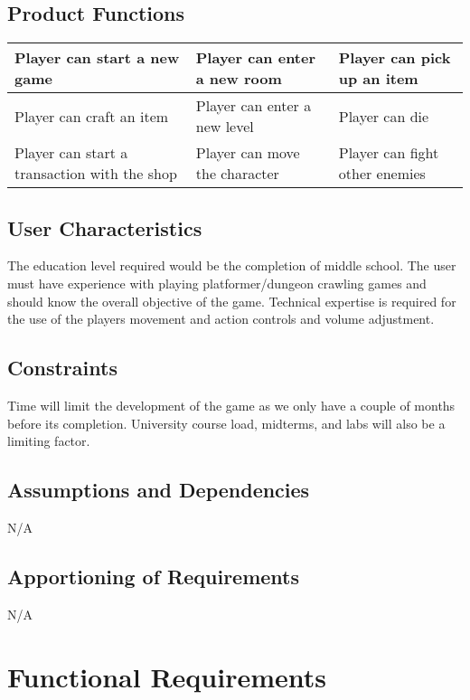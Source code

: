 \documentclass[12pt, titlepage]{article}
\begin{document}
  
  \subsection{Product Functions}
   \begin{center}
    \begin{tabular}{ | m{5em} | m{5em}| m{5em} | } 
    \hline
    Player can start a new game & Player can enter a new room & Player can pick up an item \\ 
    \hline
    Player can craft an item & Player can enter a new level & Player can die \\ 
    \hline
    Player can start a transaction with the shop & Player can move the character & Player can fight other enemies \\ 
    \hline
    \end{tabular}
    \end{center}
  \subsection{User Characteristics}
  The education level required would be the completion of middle school. The user must have experience with playing platformer/dungeon crawling games and should know the overall objective of the game. Technical expertise is required for the use of the players movement and action controls and volume adjustment.
  \subsection{Constraints}
  Time will limit the development of the game as we only have a couple of months before its completion. University course load, midterms, and labs will also be a limiting factor.
  \subsection{Assumptions and Dependencies}
  N/A
  \subsection{Apportioning of Requirements}
  N/A

\section{Functional Requirements}
\end{document}
